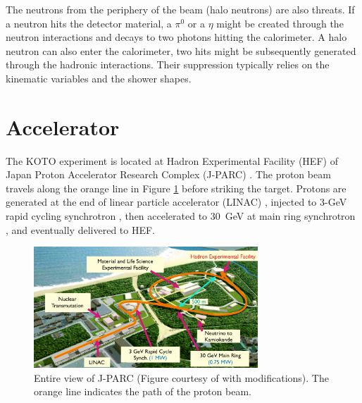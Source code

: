 The neutrons from the periphery of the beam (halo neutrons) are also threats. If a neutron hits the detector material, a $\pi^0$ or a $\eta$ might be created through the neutron interactions and decays to two photons hitting the calorimeter. A halo neutron can also enter the calorimeter, two hits might be subsequently generated through the hadronic interactions. Their suppression typically relies on the kinematic variables and the shower shapes.


\section{Accelerator}

The KOTO experiment is located at Hadron Experimental Facility (HEF) of Japan Proton Accelerator Research Complex (J-PARC) \parencite{JPARC_intro}. The proton beam travels along the orange line in Figure \ref{fig:JPARC_site} before striking the target. Protons are generated at the end of linear particle accelerator (LINAC) \parencite{LINAC}, injected to 3-GeV rapid cycling synchrotron \parencite{RCS},  then accelerated to 30~GeV at main ring synchrotron \parencite{MR}, and eventually delivered to HEF.

\begin{figure}[h]
\begin{center}
\captionsetup{width=.99\linewidth}
\includegraphics[width=0.75\textwidth]{Figures/Chapter3/JPARC_facility.pdf}
\caption{Entire view of J-PARC (Figure courtesy of \parencite{JPARC_intro} with modifications). The orange line indicates the path of the proton beam.}
\label{fig:JPARC_site}
\end{center}
\end{figure}
 
